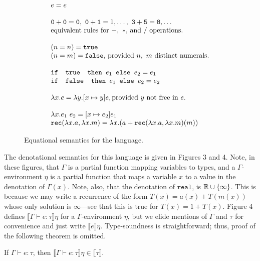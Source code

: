 \begin{figure}
\[
\begin{array}{lr}
e = e \\ \\
\texttt{0} + \texttt{0} = \texttt{0}, \ \texttt{0} + \texttt{1} = 1, \ldots, \ \texttt{3} + \texttt{5} = \texttt{8}, \ldots  \\
\text{equivalent rules for } -, \ * \text{, and } /\text{ operations.}
\\ \\
(n =n) = \texttt{true} \\ (n=m) = \texttt{false}\text{, provided } n, \ m \text{ distinct numerals.}\\ \\ 
\ifelse{\texttt{ true }}{e_1}{e_2} = e_1 \\
\ifelse{\texttt{ false }}{e_1}{e_2} = e_2 \\ \\ 
\lambda x.e = \lambda y.[x \mapsto y]e, \text{provided } y \text{ not free in } e. \\ \\ 
\lambda x.e_1 \ e_2 = [x \mapsto e_2]e_1 \\
\texttt{rec}(\lambda x.a, \lambda x.m) = 
			\lambda x.(a + \texttt{rec}(\lambda x.a, \lambda x.m)(m)) 
\end{array}
\]
\caption{Equational semantics for the language.}
\label{fig:eqsem}
\end{figure}

The denotational semantics for this language is given in Figures 3 and 4. Note, in these figures, that $\Gamma$ is a partial function mapping variables to types, and a
 $\Gamma$-environment $\eta$ is a partial function that maps a variable $x$ to a value in the
 denotation of $\Gamma(x)$. Note, also, that the denotation of $\texttt{real}$, is $\mathbb{R} \cup \{\infty\}$. This is because
 we may write a recurrence of the form $T(x) = a(x) + T(m(x))$ whose only solution is $\infty$---see that this is true
 for $T(x) = 1 + T(x)$.
 Figure 4 defines $\llbracket \Gamma \vdash e: \tau\rrbracket\eta$ for 
a $\Gamma$-environment $\eta$, but we elide mentions of $\Gamma$ and $\tau$ for convenience and just write
$\llbracket e\rrbracket\eta$. Type-soundness is straightforward; thus, proof of the following theorem is omitted.

\begin{thm}
If $\Gamma \vdash e:\tau$, then $\llbracket \Gamma \vdash e : \tau \rrbracket\eta \in \llbracket \tau \rrbracket$.
\end{thm}

